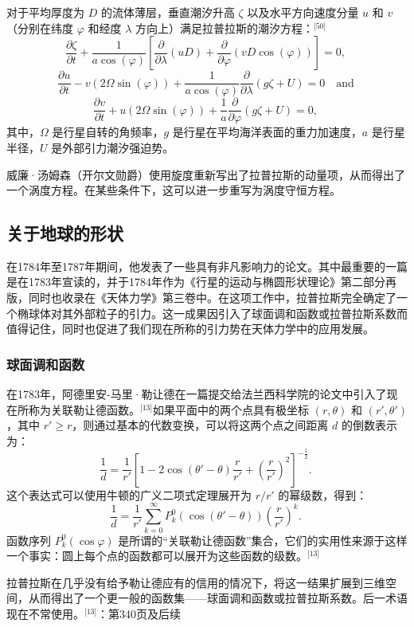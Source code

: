 对于平均厚度为 \( D \) 的流体薄层，垂直潮汐升高 \( \zeta \) 以及水平方向速度分量 \( u \) 和 \( v \)（分别在纬度 \( \varphi \) 和经度 \( \lambda \) 方向上）满足拉普拉斯的潮汐方程：\(^\text{[50]}\)
\[
\frac{\partial \zeta}{\partial t} + \frac{1}{a \cos(\varphi)} \left[ \frac{\partial}{\partial \lambda} (uD) + \frac{\partial}{\partial \varphi} \left( vD \cos(\varphi) \right) \right] = 0,~
\]
\[
\frac{\partial u}{\partial t} - v \left( 2 \Omega \sin(\varphi) \right) + \frac{1}{a \cos(\varphi)} \frac{\partial}{\partial \lambda} \left( g \zeta + U \right) = 0 \quad \text{and}~
\]
\[
\frac{\partial v}{\partial t} + u \left( 2 \Omega \sin(\varphi) \right) + \frac{1}{a} \frac{\partial}{\partial \varphi} \left( g \zeta + U \right) = 0,~
\]
其中，\( \Omega \) 是行星自转的角频率，\( g \) 是行星在平均海洋表面的重力加速度，\( a \) 是行星半径，\( U \) 是外部引力潮汐强迫势。

威廉·汤姆森（开尔文勋爵）使用旋度重新写出了拉普拉斯的动量项，从而得出了一个涡度方程。在某些条件下，这可以进一步重写为涡度守恒方程。
\subsection{关于地球的形状}  
在1784年至1787年期间，他发表了一些具有非凡影响力的论文。其中最重要的一篇是在1783年宣读的，并于1784年作为《行星的运动与椭圆形状理论》第二部分再版，同时也收录在《天体力学》第三卷中。在这项工作中，拉普拉斯完全确定了一个椭球体对其外部粒子的引力。这一成果因引入了球面调和函数或拉普拉斯系数而值得记住，同时也促进了我们现在所称的引力势在天体力学中的应用发展。
\subsubsection{球面调和函数}
在1783年，阿德里安-马里·勒让德在一篇提交给法兰西科学院的论文中引入了现在所称为关联勒让德函数。\(^\text{[13]}\)如果平面中的两个点具有极坐标 \((r, \theta)\) 和 \((r', \theta')\)，其中 \(r' \geq r\)，则通过基本的代数变换，可以将这两个点之间距离 \(d\) 的倒数表示为：
\[
\frac{1}{d} = \frac{1}{r'} \left[ 1 - 2 \cos(\theta' - \theta) \frac{r}{r'} + \left( \frac{r}{r'} \right)^2 \right]^{-\frac{1}{2}}.~
\]
这个表达式可以使用牛顿的广义二项式定理展开为 \(r/r'\) 的幂级数，得到：
\[
\frac{1}{d} = \frac{1}{r'} \sum_{k=0}^{\infty} P_k^0 (\cos(\theta' - \theta)) \left( \frac{r}{r'} \right)^k.~
\]
函数序列 \( P_k^0(\cos \varphi) \) 是所谓的“关联勒让德函数”集合，它们的实用性来源于这样一个事实：圆上每个点的函数都可以展开为这些函数的级数。\(^\text{[13]}\)

拉普拉斯在几乎没有给予勒让德应有的信用的情况下，将这一结果扩展到三维空间，从而得出了一个更一般的函数集——球面调和函数或拉普拉斯系数。后一术语现在不常使用。\(^\text{[13]}\)：第340页及后续
